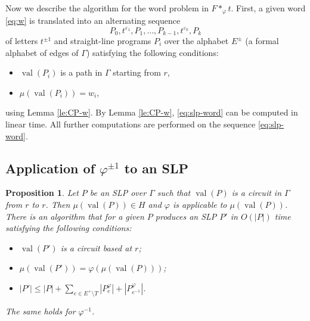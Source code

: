 \documentclass[12pt,oneside]{amsart}
\newtheorem{proposition}[theorem]{Proposition}
\theoremstyle{definition}
\theoremstyle{case}
\DeclareMathOperator{\val}{val}
\begin{document}
Now we describe the algorithm for the word problem in $F\ast_\varphi t$.
First, a given word  \eqref{eq:w} is translated into an alternating sequence
\begin{equation}\label{eq:slp-word}
P_0, t^{\varepsilon_1},
P_1, \dots,
P_{k-1}, t^{\varepsilon_k},P_k
\end{equation}
of letters $t^{\pm 1}$ and straight-line programs $P_i$
over the alphabet $E^\pm$
(a formal alphabet of edges of $\Gamma$)
satisfying the following conditions:
\begin{itemize}
\item 
$\val(P_i)$ is a path in $\Gamma$ starting from $r$,
\item 
$\mu(\val(P_i))=w_i$,
\end{itemize}
using Lemma \ref{le:CP-w}.
By Lemma \ref{le:CP-w}, \eqref{eq:slp-word}
can be computed in linear time.
All further computations are performed on the sequence \eqref{eq:slp-word}.


\subsection{Application of $\varphi^{\pm1}$ to an SLP}


\begin{proposition}\label{pr:apply-phi}
Let $P$ be an SLP over $\Gamma$ such that $\val(P)$ is a 
circuit in $\Gamma$ from $r$ to $r$.
Then $\mu(\val(P)) \in H$ and $\varphi$ is applicable to
$\mu(\val(P))$. 
There is an algorithm that
for a given $P$ produces an SLP $P'$ in $O(|P|)$ time
satisfying the following conditions:
\begin{itemize}
\item[(a)]
$\val(P')$ is a circuit based at $r$;
\item[(b)]
$\mu(\val(P')) = \varphi(\mu(\val(P)))$;
\item[(c)]
$|P'|\le |P| + \sum_{e\in E^+\setminus T}
|P_e^\varphi|+
|P_{e^{-1}}^\varphi|$.
\end{itemize}
The same holds for $\varphi^{-1}$.
\end{proposition}
    
\end{document}
